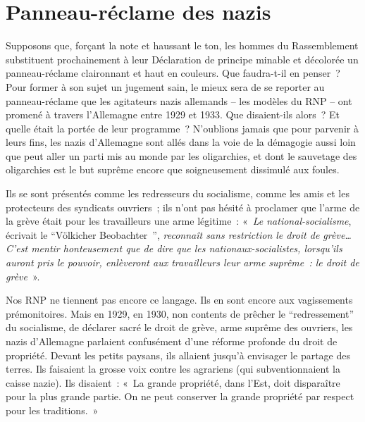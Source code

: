 \documentclass[french,twoside]{book} %
\begin{document}
\section[Panneau-réclame des nazis]{Panneau-réclame des nazis}
\noindent Supposons que, forçant la note et haussant le ton, les hommes du Rassemblement substituent prochainement à leur Déclaration de principe minable et décolorée un panneau-réclame claironnant et haut en couleurs. Que faudra-t-il en penser ? Pour former à son sujet un jugement sain, le mieux sera de se reporter au panneau-réclame que les agitateurs nazis allemands – les modèles du RNP – ont promené à travers l’Allemagne entre 1929 et 1933. Que disaient-ils alors ? Et quelle était la portée de leur programme ? N’oublions jamais que pour parvenir à leurs fins, les nazis d’Allemagne sont allés dans la voie de la démagogie aussi loin que peut aller un parti mis au monde par les oligarchies, et dont le sauvetage des oligarchies est le but suprême encore que soigneusement dissimulé aux foules.\par
Ils se sont présentés comme les redresseurs du socialisme, comme les amis et les protecteurs des syndicats ouvriers ; ils n’ont pas hésité à proclamer que l’arme de la grève était pour les travailleurs une arme légitime : « \emph{Le national-socialisme}, écrivait le “Völkicher Beobachter ”, \emph{reconnaît sans restriction le droit de grève… C’est mentir honteusement que de dire que les nationaux-socialistes, lorsqu’ils auront pris le pouvoir, enlèveront aux travailleurs leur arme suprême : le droit de grève} ».\par
Nos RNP ne tiennent pas encore ce langage. Ils en sont encore aux vagissements prémonitoires. Mais en 1929, en 1930, non contents de prêcher le “redressement” du socialisme, de déclarer sacré le droit de grève, arme suprême des ouvriers, les nazis d’Allemagne parlaient confusément d’une réforme profonde du droit de propriété. Devant les petits paysans, ils allaient jusqu’à envisager le partage des terres. Ils faisaient la grosse voix contre les agrariens (qui subventionnaient la caisse nazie). Ils disaient : « La grande propriété, dans l’Est, doit disparaître pour la plus grande partie. On ne peut conserver la grande propriété par respect pour les traditions. »
\end{document}

